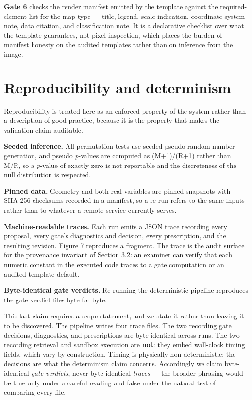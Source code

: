 \textbf{Gate 6} checks the render manifest emitted by the template against the required-element list for the map type --- title, legend, scale indication, coordinate-system note, data citation, and classification note. It is a declarative checklist over what the template guarantees, not pixel inspection, which places the burden of manifest honesty on the audited templates rather than on inference from the image.

\section{Reproducibility and determinism}
Reproducibility is treated here as an enforced property of the system rather than a description of good practice, because it is the property that makes the validation claim auditable.

\textbf{Seeded inference.} All permutation tests use seeded pseudo-random number generation, and pseudo \emph{p}-values are computed as (M+1)/(R+1) rather than M/R, so a \emph{p}-value of exactly zero is not reportable and the discreteness of the null distribution is respected.

\textbf{Pinned data.} Geometry and both real variables are pinned snapshots with SHA-256 checksums recorded in a manifest, so a re-run refers to the same inputs rather than to whatever a remote service currently serves.

\textbf{Machine-readable traces.} Each run emits a JSON trace recording every proposal, every gate's diagnostics and decision, every prescription, and the resulting revision. Figure 7 reproduces a fragment. The trace is the audit surface for the provenance invariant of Section 3.2: an examiner can verify that each numeric constant in the executed code traces to a gate computation or an audited template default.

\textbf{Byte-identical gate verdicts.} Re-running the deterministic pipeline reproduces the gate verdict files byte for byte.

This last claim requires a scope statement, and we state it rather than leaving it to be discovered. The pipeline writes four trace files. The two recording gate decisions, diagnostics, and prescriptions are byte-identical across runs. The two recording retrieval and sandbox execution are \textbf{not}: they embed wall-clock timing fields, which vary by construction. Timing is physically non-deterministic; the decisions are what the determinism claim concerns. Accordingly we claim byte-identical \emph{gate verdicts}, never byte-identical \emph{traces} --- the broader phrasing would be true only under a careful reading and false under the natural test of comparing every file.

